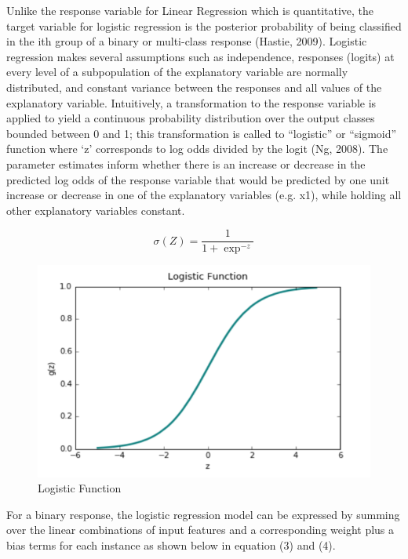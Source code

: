 \documentclass{llncs}
\begin{document}
Unlike the response variable for Linear Regression which is quantitative, the target variable for logistic regression is the posterior probability of being classified in the ith group of a binary or multi-class response (Hastie, 2009). Logistic regression makes several assumptions such as independence, responses (logits) at every level of a subpopulation of the explanatory variable are normally distributed, and constant variance between the responses and all values of the explanatory variable. Intuitively, a transformation to the response variable is applied to yield a continuous probability distribution over the output classes bounded between 0 and 1; this transformation is called to “logistic” or “sigmoid” function where ‘z’ corresponds to log odds divided by the logit (Ng, 2008). The parameter estimates inform whether there is an increase or decrease in the predicted log odds of the response variable that would be predicted by one unit increase or decrease in one of the explanatory variables (e.g. x1), while holding all other explanatory variables constant.

\begin{equation}
\sigma(Z) = \frac{1}{1+\exp^{-z}}
\end{equation}


\begin{figure}
\centering
\includegraphics[scale=1.0]{sigmoid.png}
\caption{Logistic Function}
\end{figure}

For a binary response, the logistic regression model can be expressed by summing over the linear combinations of input features and a corresponding weight plus a bias terms for each instance as shown below in equation (3) and (4).
\end{document}
